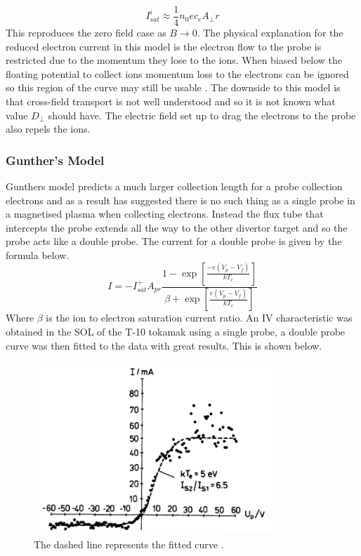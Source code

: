 \documentclass[12pt]{article}
\def\be{\begin{equation}}
\def\ee{\end{equation}}
\begin{document}
\be 
I^i_{sat} \approx \frac{1}{4} n_0 e c_e A_\perp r 
\ee
This reproduces the zero field case as $B \to 0$. The physical explanation for the reduced electron current in this model is the electron flow to the probe is restricted due to the momentum they lose to the ions. When biased below the floating potential to collect ions momentum loss to the electrons can be ignored so this region of the curve may still be usable \cite{matthews}. The downside to this model is that cross-field transport is not well understood and so it is not known what value $D_\perp$ should have. 
The electric field set up to drag the electrons to the probe also repels the ions. 

\subsubsection{Gunther's Model}
Gunthers model predicts a much larger collection length for a probe collection electrons and as a result has suggested there is no such thing as a single probe in a magnetised plasma when collecting electrons. Instead the flux tube that intercepts the probe extends all the way to the other divertor target and so the probe acts like a double probe. The current for a double probe is given by the formula below.
\be 
I = - I^{+}_{sat} A_{pr} \frac{1-\exp\left[\frac{-e(V_p-V_{f})}{k T_e}\right]}{\beta + \exp\left[\frac{e(V_p-V_{f})}{k T_e}\right]}
\ee
Where $\beta$ is the ion to electron saturation current ratio. An IV characteristic was obtained in the SOL of the T-10 tokamak using a single probe, a double probe curve was then fitted to the data with great results. This is shown below.
\begin{figure}[H]
\centering
\includegraphics[width=0.8\textwidth]{doubleprobe}
\caption{The dashed line represents the fitted curve \cite{Guenther1990236}.}
\label{fig:doubleprobe}
\end{figure}
\end{document}
